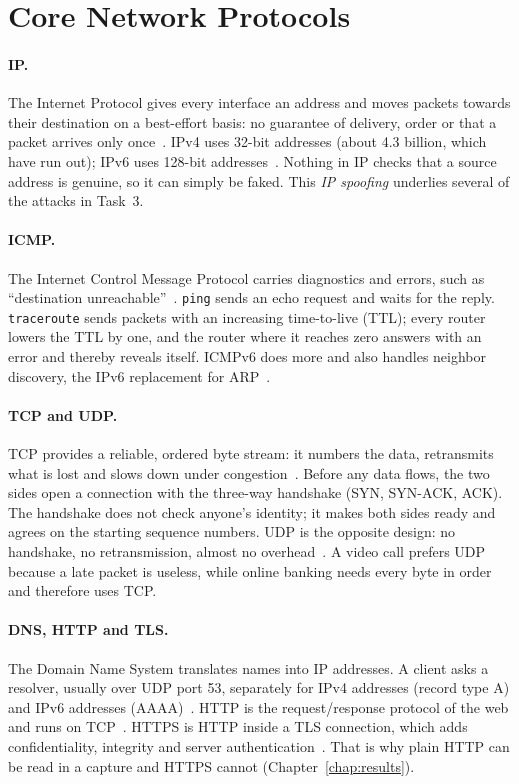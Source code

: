 \section{Core Network Protocols}\label{sec:protocols}

\paragraph{IP.} The Internet Protocol gives every interface an address and moves packets towards their destination on a best-effort basis: no guarantee of delivery, order or that a packet arrives only once~\cite{rfc791}. IPv4 uses 32-bit addresses (about 4.3 billion, which have run out); IPv6 uses 128-bit addresses~\cite{rfc8200}. Nothing in IP checks that a source address is genuine, so it can simply be faked. This \emph{IP spoofing} underlies several of the attacks in Task~3.

\paragraph{ICMP.} The Internet Control Message Protocol carries diagnostics and errors, such as \enquote{destination unreachable}~\cite{rfc792}. \texttt{ping} sends an echo request and waits for the reply. \texttt{traceroute} sends packets with an increasing time-to-live (TTL); every router lowers the TTL by one, and the router where it reaches zero answers with an error and thereby reveals itself. ICMPv6 does more and also handles neighbor discovery, the IPv6 replacement for ARP~\cite{rfc4443,rfc4861}.

\paragraph{TCP and UDP.} TCP provides a reliable, ordered byte stream: it numbers the data, retransmits what is lost and slows down under congestion~\cite{rfc9293}. Before any data flows, the two sides open a connection with the three-way handshake (SYN, SYN-ACK, ACK). The handshake does not check anyone's identity; it makes both sides ready and agrees on the starting sequence numbers. UDP is the opposite design: no handshake, no retransmission, almost no overhead~\cite{rfc768}. A video call prefers UDP because a late packet is useless, while online banking needs every byte in order and therefore uses TCP.

\paragraph{DNS, HTTP and TLS.} The Domain Name System translates names into IP addresses. A client asks a resolver, usually over UDP port 53, separately for IPv4 addresses (record type A) and IPv6 addresses (AAAA)~\cite{rfc1035}. HTTP is the request/response protocol of the web and runs on TCP~\cite{rfc9110}. HTTPS is HTTP inside a TLS connection, which adds confidentiality, integrity and server authentication~\cite{rfc8446}. That is why plain HTTP can be read in a capture and HTTPS cannot (Chapter~\ref{chap:results}).

